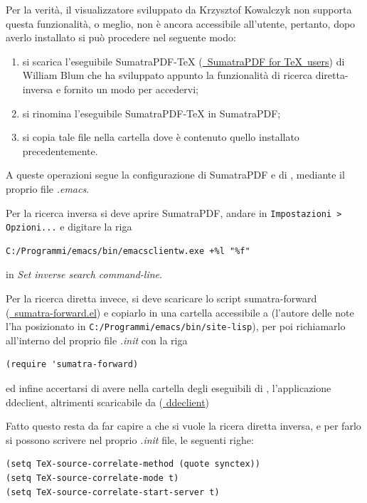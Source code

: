 \documentclass[10pt,a4paper]{article}
\begin{document}
Per la verità, il visualizzatore sviluppato da Krzysztof Kowalczyk non
supporta questa funzionalità, o meglio, non è ancora accessibile
all'utente, pertanto, dopo averlo installato si può
procedere nel seguente modo:
\begin{enumerate}
\item si scarica l'eseguibile \textsf{SumatraPDF-TeX}
  (\href{http://william.famille-blum.org/software/sumatra/}{\mano{}~SumatraPDF
    for \TeX\ users}) di William Blum
  che ha sviluppato appunto la funzionalità di ricerca diretta-inversa
  e fornito un modo per accedervi;
\item si rinomina l'eseguibile SumatraPDF-TeX in SumatraPDF;
\item si copia tale file nella cartella dove è contenuto quello
  installato precedentemente.
\end{enumerate}

A queste operazioni segue la configurazione di \textsf{SumatraPDF} e di \emacs,
mediante il proprio file \emph{.emacs}.

Per la ricerca inversa si deve aprire SumatraPDF, andare in
\texttt{Impostazioni > Opzioni...} e digitare la riga
\begin{Verbatim}
C:/Programmi/emacs/bin/emacsclientw.exe +%l "%f"
\end{Verbatim}
in \emph{Set inverse search command-line}.

Per la ricerca diretta invece, si deve scaricare lo script
\textsf{sumatra-forward} (\href{http://william.famille-blum.org/software/sumatra/sumatra-forward.el}{\mano{}~sumatra-forward.el})
e copiarlo in una cartella accessibile a \emacs{} (l'autore delle note
l'ha posizionato in \texttt{C:/Programmi/emacs/bin/site-lisp}), per
poi richiamarlo all'interno del proprio file \emph{.init} con la riga
\begin{Verbatim}
(require 'sumatra-forward)
\end{Verbatim}
ed infine accertarsi di avere nella cartella degli eseguibili di
\emacs, l'applicazione \textsf{ddeclient}, altrimenti scaricabile da
(\href{http://ftp.gnu.org/old-gnu/emacs/windows/docs/ntemacs/contrib/ddeclient.zip}{\mano{}
  \textsf{ddeclient}})

Fatto questo resta da far capire a \emacs{} che si vuole la ricera
diretta inversa, e per farlo si possono scrivere nel proprio \emph{.init}
file, le seguenti righe:
\begin{Verbatim}
(setq TeX-source-correlate-method (quote synctex))
(setq TeX-source-correlate-mode t)
(setq TeX-source-correlate-start-server t)
\end{Verbatim}
\end{document}
